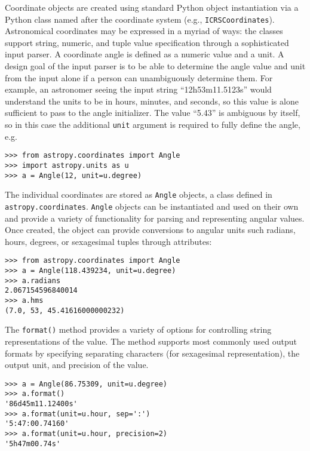 \documentclass[traditabstract]{aa}
\begin{document}

Coordinate objects are created using standard
Python object instantiation via a Python class named 
after the coordinate system (e.g., \texttt{ICRSCoordinates}). 
Astronomical coordinates may be expressed in a myriad
of ways: the classes support string, numeric, and tuple value
specification through a sophisticated input parser.
A coordinate angle is defined as a numeric value and a unit.
A design goal of the input parser is to be able to determine the
angle value and unit from the input alone if a person can
unambiguously determine them.
For example, an astronomer seeing the input string ``12h53m11.5123s''
would understand the units to be in hours, minutes, and seconds, so this
value is alone sufficient to pass to the angle initializer. The value ``5.43'' is
ambiguous by itself, so in this case the additional \texttt{unit} argument is required to
fully define the angle, e.g.

\begin{verbatim}
>>> from astropy.coordinates import Angle
>>> import astropy.units as u
>>> a = Angle(12, unit=u.degree)
\end{verbatim}

The individual coordinates are stored as \texttt{Angle}
objects, a class defined in \texttt{astropy.coordinates}.
\texttt{Angle} objects can be instantiated and used on their
own and provide a variety of functionality for parsing and representing
angular values. Once created, the object can provide conversions to angular units
such radians, hours, degrees, or sexagesimal tuples through attributes:

\begin{verbatim}
>>> from astropy.coordinates import Angle
>>> a = Angle(118.439234, unit=u.degree)
>>> a.radians
2.067154596840014
>>> a.hms
(7.0, 53, 45.41616000000232)
\end{verbatim}

The \texttt{format()} method provides a variety of options for
controlling string representations of the value. The method supports
most commonly used output formats by specifying separating characters
(for sexagesimal representation), the output unit, and precision of
the value.

\begin{verbatim}
>>> a = Angle(86.75309, unit=u.degree)
>>> a.format()
'86d45m11.12400s'
>>> a.format(unit=u.hour, sep=':')
'5:47:00.74160'
>>> a.format(unit=u.hour, precision=2)
'5h47m00.74s'
\end{verbatim}
\end{document}
